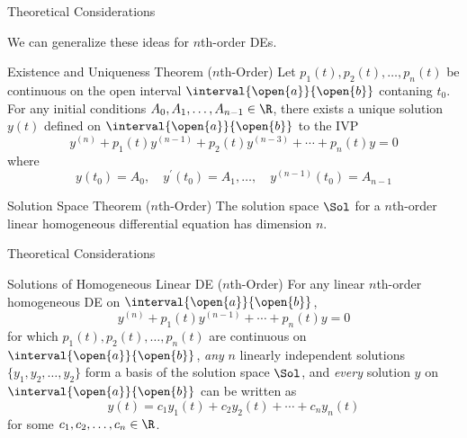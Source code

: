 \documentclass{beamer}
\begin{document}
\begin{frame}{Theoretical Considerations}
\begin{block}{}
We can generalize these ideas for $n$th-order DEs.
\end{block}\pause
\begin{block}{Existence and Uniqueness Theorem ($n$th-Order)}
Let $p_1(t), p_2(t),\ldots,p_n(t)$ be continuous on the open interval $\interval{\open{a}}{\open{b}}$ contaning $t_0$. For any initial conditions $A_0,A_1,\ldots,A_{n-1}\in\R$, there exists a unique solution $y(t)$ defined on $\interval{\open{a}}{\open{b}}$ to the IVP
\begin{equation*}
y^{(n)}+p_1(t)y^{(n-1)}+p_2(t)y^{(n-3)}+\cdots+p_n(t)y=0
\end{equation*}
where
\begin{equation*}
y(t_0)=A_0,\quad
y^{\prime}(t_0)=A_1,
\ldots,\quad
y^{(n-1)}(t_0)=A_{n-1}
\end{equation*}
\end{block}\pause
\begin{block}{Solution Space Theorem ($n$th-Order)}
The solution space $\Sol$ for a $n$th-order linear homogeneous differential equation has dimension $n$.
\end{block}
\end{frame}

\begin{frame}{Theoretical Considerations}
\begin{block}{Solutions of Homogeneous Linear DE ($n$th-Order)}
For any linear $n$th-order homogeneous DE on $\interval{\open{a}}{\open{b}}$,
\begin{equation*}
y^{(n)}+p_1(t)y^{(n-1)}+\cdots+p_n(t)y=0
\end{equation*}
for which $p_1(t), p_2(t),\ldots,p_n(t)$ are continuous on $\interval{\open{a}}{\open{b}}$, \emph{any} $n$ linearly independent solutions $\{y_1,y_2,\ldots,y_2\}$ form a basis of the solution space $\Sol$, and \emph{every} solution $y$ on $\interval{\open{a}}{\open{b}}$ can be written as
\begin{equation*}
y(t)=c_1y_1(t)+c_2y_2(t)+\cdots+c_n y_n(t)
\end{equation*}
for some $c_1,c_2,\ldots,c_n\in\R$.
\end{block}
\end{frame}
\end{document}
